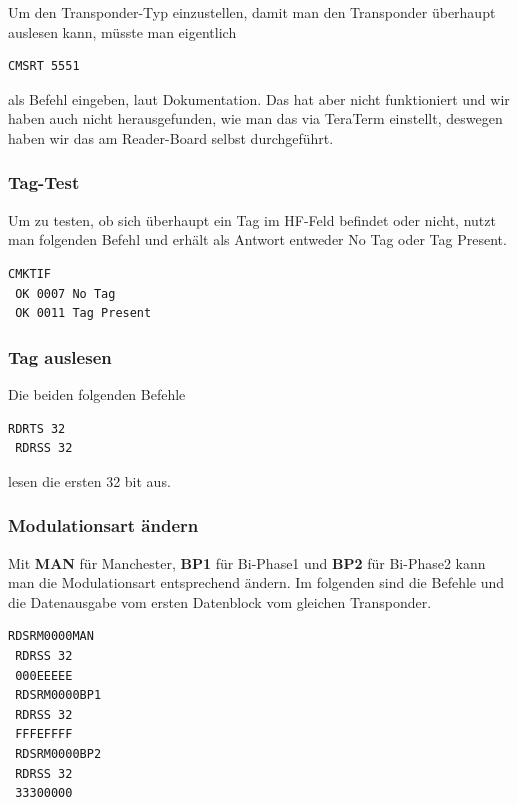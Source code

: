 \documentclass[paper=a4,fontsize=11pt,headsepline,footsepline,parskip=half]{scrartcl}
\begin{document}
Um den Transponder-Typ einzustellen, damit man den Transponder überhaupt auslesen kann, müsste man eigentlich

\begin{lstlisting}[caption={Transponder-Typ einstellen.}]
 CMSRT 5551
\end{lstlisting}

als Befehl eingeben, laut Dokumentation. Das hat aber nicht funktioniert und wir haben auch nicht herausgefunden, wie man das via TeraTerm
einstellt, deswegen haben wir das am Reader-Board selbst durchgeführt.

\subsubsection{Tag-Test}

Um zu testen, ob sich überhaupt ein Tag im HF-Feld befindet oder nicht, nutzt man folgenden Befehl und erhält als Antwort entweder \glqq 
No Tag\grqq{} oder \glqq Tag Present\grqq.

\begin{lstlisting}[caption={Vorhandensein des Tags im HF-Feld testen.}]
 CMKTIF
 OK 0007 No Tag
 OK 0011 Tag Present
\end{lstlisting}

\subsubsection{Tag auslesen}

Die beiden folgenden Befehle

\begin{lstlisting}[caption={Tag auslesen.}]
 RDRTS 32
 RDRSS 32
\end{lstlisting}

lesen die ersten 32 bit aus.

\subsubsection{Modulationsart ändern}

Mit \textbf{MAN} für \glqq Manchester\grqq{}, \textbf{BP1} für \glqq Bi-Phase1\grqq{} und \textbf{BP2} für \glqq Bi-Phase2\grqq{} kann
man die Modulationsart entsprechend ändern. Im folgenden sind die Befehle und die Datenausgabe vom ersten Datenblock vom gleichen
Transponder.

\begin{lstlisting}[caption={Modulationsart ändern und Ausgabe anzeigen.}]
 RDSRM0000MAN
 RDRSS 32
 000EEEEE
 RDSRM0000BP1
 RDRSS 32
 FFFEFFFF
 RDSRM0000BP2
 RDRSS 32
 33300000
\end{lstlisting}
\end{document}
